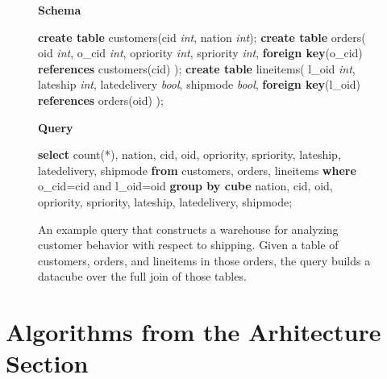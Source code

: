 \begin{figure}
\begin{center}
\textbf{Schema}
\end{center}
\begin{algorithmic}
\STATE \textbf{create table} customers(cid \textit{int}, nation \textit{int}); 
\STATE \textbf{create table} orders(
\STATE \hspace*{0.1in} oid \textit{int}, o\_cid \textit{int}, opriority \textit{int}, spriority \textit{int},
\STATE \hspace*{0.1in}  \textbf{foreign key}(o\_cid) \textbf{references} customers(cid)
\STATE );
\STATE \textbf{create table} lineitems(
\STATE \hspace*{0.1in} l\_oid \textit{int}, lateship \textit{int}, latedelivery \textit{bool}, shipmode \textit{bool},
\STATE \hspace*{0.1in} \textbf{foreign key}(l\_oid) \textbf{references} orders(oid)
\STATE );
\end{algorithmic}
\begin{center}
\textbf{Query}
\end{center}
\begin{algorithmic}
\STATE \textbf{select} count(*),
\STATE \hspace*{0.1in} nation, cid, oid, opriority, spriority, 
\STATE \hspace*{0.1in} lateship, latedelivery, shipmode 
\STATE \textbf{from} customers, orders, lineitems 
\STATE \textbf{where} o\_cid=cid and l\_oid=oid 
\STATE \textbf{group by cube} 
\STATE \hspace*{0.1in} nation, cid, oid, opriority, spriority, 
\STATE \hspace*{0.1in} lateship, latedelivery, shipmode;
\end{algorithmic}
\caption{An example query that constructs a warehouse for analyzing customer behavior with respect to shipping.  Given a table of customers, orders, and lineitems in those orders, the query builds a datacube over the full join of those tables.}
\label{fig:example}  
\end{figure}


\section{Algorithms from the Arhitecture Section}


